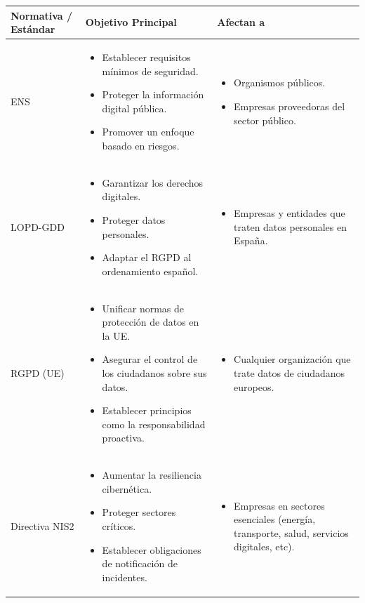 \documentclass[a4paper, 10pt]{article}
\begin{document}
\begin{table}[H]
\centering
\begin{tabular}{|p{2.5cm}|p{7.5cm}|p{5.5cm}|}
\hline
\textbf{Normativa / Estándar} & \textbf{Objetivo Principal} & \textbf{Afectan a} \\ \hline
ENS & \begin{itemize} \item Establecer requisitos mínimos de seguridad. \item Proteger la información digital pública. \item Promover un enfoque basado en riesgos. \end{itemize} & \begin{itemize} \item Organismos públicos. \item Empresas proveedoras del sector público. \end{itemize} \\ \hline
LOPD-GDD & \begin{itemize} \item Garantizar los derechos digitales. \item Proteger datos personales. \item Adaptar el RGPD al ordenamiento español. \end{itemize} & \begin{itemize} \item Empresas y entidades que traten datos personales en España. \end{itemize} \\ \hline
RGPD (UE) & \begin{itemize} \item Unificar normas de protección de datos en la UE. \item Asegurar el control de los ciudadanos sobre sus datos. \item Establecer principios como la responsabilidad proactiva. \end{itemize} & \begin{itemize} \item Cualquier organización que trate datos de ciudadanos europeos. \end{itemize} \\ \hline
Directiva NIS2 & \begin{itemize} \item Aumentar la resiliencia cibernética. \item Proteger sectores críticos. \item Establecer obligaciones de notificación de incidentes. \end{itemize} & \begin{itemize} \item Empresas en sectores esenciales (energía, transporte, salud, servicios digitales, etc). \end{itemize} \\ \hline

\end{tabular}
\end{table}
\end{document}
